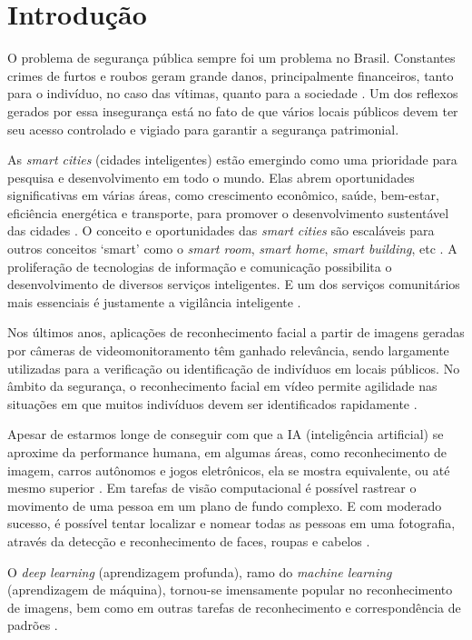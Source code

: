 \chapter{Introdução}
\label{chap:intro}
\thispagestyle{plain}

O problema de segurança pública sempre foi um problema no Brasil. Constantes crimes de furtos e roubos geram grande danos, principalmente financeiros, tanto para o indivíduo, no caso das vítimas, quanto para a sociedade \cite{Cerqueira2007, G12013}. Um dos reflexos gerados por essa insegurança está no fato de que vários locais públicos devem ter seu acesso controlado e vigiado para garantir a segurança patrimonial.

As \textit{smart cities} (cidades inteligentes) estão emergindo como uma prioridade para pesquisa e desenvolvimento em todo o mundo. Elas abrem oportunidades significativas em várias áreas, como crescimento econômico, saúde, bem-estar, eficiência energética e transporte, para promover o desenvolvimento sustentável das cidades \cite{Song2017}. O conceito e oportunidades das \textit{smart cities} são escaláveis para outros conceitos ‘smart’ como o \textit{smart room}, \textit{smart home}, \textit{smart building}, etc \cite{Pacheco2018}. A proliferação de tecnologias de informação e comunicação possibilita o desenvolvimento de diversos serviços inteligentes. E um dos serviços comunitários mais essenciais é justamente a vigilância inteligente \cite{Chen2016, Nikouei2018}.

Nos últimos anos, aplicações de reconhecimento facial a partir de imagens geradas por câmeras de videomonitoramento têm ganhado relevância, sendo largamente utilizadas para a verificação ou identificação de indivíduos em locais públicos. No âmbito da segurança, o reconhecimento facial em vídeo permite agilidade nas situações em que muitos indivíduos devem ser identificados rapidamente \cite{Quirita2014}.

Apesar de estarmos longe de conseguir com que a IA (inteligência artificial) se aproxime da performance humana, em algumas áreas, como reconhecimento de imagem, carros autônomos e jogos eletrônicos, ela se mostra equivalente, ou até mesmo superior \cite{Aggarwal2018}. Em tarefas de visão computacional é possível rastrear o movimento de uma pessoa em um plano de fundo complexo. E com moderado sucesso, é possível tentar localizar e nomear todas as pessoas em uma fotografia, através da detecção e reconhecimento de faces, roupas e cabelos \cite{Szeliski2011}.

O \textit{deep learning} (aprendizagem profunda), ramo do \textit{machine learning} (aprendizagem de máquina), tornou-se imensamente popular no reconhecimento de imagens, bem como em outras tarefas de reconhecimento e correspondência de padrões \cite{Verhelst2017}.


